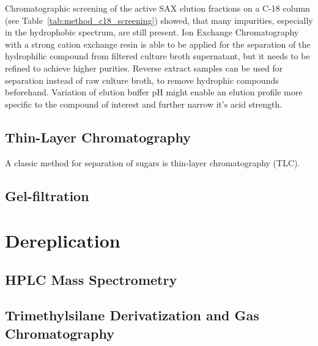 Chromatographic screening of the active SAX elution fractions on a C-18 column (see Table~\ref{tab:method_c18_screening}) showed, that many impurities, especially in the hydrophobic spectrum, are still present.
Ion Exchange Chromatography with a strong cation exchange resin is able to be applied for the separation of the hydrophilic compound from filtered culture broth supernatant, but it needs to be refined to achieve higher purities.
Reverse extract samples can be used for separation instead of raw culture broth, to remove hydrophic compounds beforehand.
Variation of elution buffer pH might enable an elution profile more specific to the compound of interest and further narrow it's acid strength.



\subsection{Thin-Layer Chromatography} %
\label{sub:results_thin_layer_chromatography}


A classic method for separation of sugars is thin-layer chromatography (TLC).
%


\subsection{Gel-filtration} %
\label{sub:results_gel_filtration}


\section{Dereplication} %
\label{sec:dereplication}

\subsection{HPLC Mass Spectrometry} %
\label{sub:hplc_mass_spectrometry}


\subsection{Trimethylsilane Derivatization and Gas Chromatography} %
\label{sub:trimethylsilane_derivatization_and_gas_chromatography_results}

